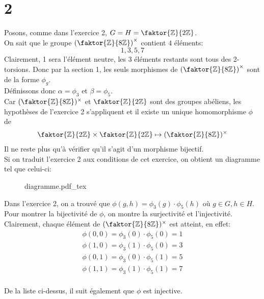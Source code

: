\documentclass[11pt, a4paper, twoside]{article}
\newcommand{\incfig}[2][1]{%
    \def\svgwidth{#1\columnwidth}
    {#2.pdf_tex}
}
\begin{document}
\section*{2}
Posons, comme dans l'exercice 2, $G=H=\faktor { \mathbb{Z}} { 2\mathbb{Z}}$.\\
On sait que le groupe $\left( \faktor { \mathbb{Z}} { 8\mathbb{Z}} \right)^{\times} $ contient $4$ éléments:
\[ 
1,3,5,7
\]
Clairement, 1 sera l'élément neutre, les 3 éléments restants sont tous des 2-torsions. Donc par la section 1, les seuls morphismes de $\left( \faktor { \mathbb{Z}} { 8\mathbb{Z}} \right)^{\times}$ sont de la forme $\phi_g$.\\
Définissons donc $\alpha = \phi_3$ et $\beta= \phi_5$.\\
Car $( \faktor { \mathbb{Z}} { 8\mathbb{Z}} )^{\times}$ et $\faktor { \mathbb{Z}} { 2\mathbb{Z}} $ sont des groupes abéliens, les hypothèses de l'exercice 2 s'appliquent et il existe un unique homomorphisme $\phi$ de
\begin{align*}
\faktor { \mathbb{Z}} { 2\mathbb{Z}} \times \faktor { \mathbb{Z}} { 2\mathbb{Z}} \mapsto ( \faktor { \mathbb{Z}} { 8\mathbb{Z}} )^{\times}
\end{align*}
Il ne reste plus qu'à vérifier qu'il s'agit d'un morphisme bijectif.\\
Si on traduit l'exercice 2 aux conditions de cet exercice, on obtient un diagramme tel que celui-ci:\\
\begin{figure}[h]
    \centering
    \incfig{diagramme}
\end{figure}



Dans l'exercice 2, on a trouvé que $\phi(g,h) = \phi_3( g) \cdot \phi_5( h)$ où $g \in G, h \in H$. \\
Pour montrer la bijectivité de $\phi$, on montre la surjectivité et l'injectivité.\\
Clairement, chaque élément de $( \faktor { \mathbb{Z}} { 8\mathbb{Z}} )^{\times}$ est atteint, en effet:
\begin{align*}
	\phi(0,0) = \phi_3(0 )  \cdot \phi_5( 0) = 1\\
	\phi(1,0) = \phi_3(1 )  \cdot \phi_5( 0) = 3\\
	\phi(0,1) = \phi_3(0 )  \cdot \phi_5( 1) = 5\\
	\phi(1,1) = \phi_3(1 )  \cdot \phi_5( 1) = 7\\
\end{align*}

De la liste ci-dessus, il suit également que $\phi$ est injective.
\end{document}
